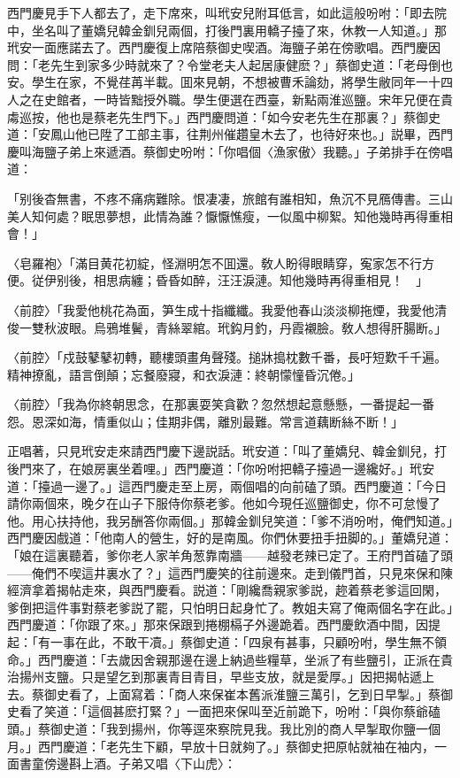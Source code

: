 西門慶見手下人都去了，走下席來，叫玳安兒附耳低言，如此這般吩咐：「即去院中，坐名叫了董嬌兒韓金釧兒兩個，打後門裏用轎子擡了來，休教一人知道。」那玳安一面應諾去了。西門慶復上席陪蔡御史喫酒。海鹽子弟在傍歌唱。西門慶因問：「老先生到家多少時就來了？令堂老夫人起居康健麽？」蔡御史道：「老母倒也安。學生在家，不覺荏苒半載。囬來見朝，不想被曹禾論劾，將學生敝同年一十四人之在史館者，一時皆黜授外職。學生便選在西臺，新點兩淮巡鹽。宋年兄便在貴䖏巡按，他也是蔡老先生門下。」西門慶問道：「如今安老先生在那裏？」蔡御史道：「安鳳山他已陞了工部主事，往荆州催趲皇木去了，也待好來也。」説畢，西門慶叫海鹽子弟上來遞酒。蔡御史吩咐：「你唱個〈漁家傲〉我聽。」子弟排手在傍唱道：

「别後杳無書，不疼不痛病難除。恨凄凄，旅館有誰相知，魚沉不見鴈傳書。三山美人知何處？眠思夢想，此情為誰？懨懨憔瘦，一似風中柳絮。知他幾時再得重相會！」

〈皂羅袍〉「滿目黄花初綻，怪淵明怎不囬還。敎人盼得眼睛穿，寃家怎不行方便。従伊别後，相思病纏；昏昏如醉，汪汪淚漣。知他幾時再得重相見！　」

〈前腔〉「我愛他桃花為面，笋生成十指纖纖。我愛他春山淡淡柳拖煙，我愛他清俊一雙秋波眼。烏鴉堆鬢，青絲翠綰。玳鈎月釣，丹霞襯臉。敎人想得肝腸断。」

〈前腔〉「戍鼓鼕鼕初轉，聽樓頭畫角聲殘。搥牀搗枕數千番，長吁短歎千千遍。精神撩亂，語言倒顛；忘餐廢寢，和衣淚漣：終朝懞憧昏沉倦。」

〈前腔〉「我為你終朝思念，在那裏耍笑貪歡？忽然想起意懸懸，一番提起一番怨。恩深如海，情重似山；佳期非偶，離別最難。常言道藕断絲不断！」

正唱著，只見玳安走來請西門慶下邊説話。玳安道：「叫了董嬌兒、韓金釧兒，打後門來了，在娘房裏坐着哩。」西門慶道：「你吩咐把轎子擡過一邊纔好。」玳安道：「擡過一邊了。」這西門慶走至上房，兩個唱的向前磕了頭。西門慶道：「今日請你兩個來，晚夕在山子下服侍你蔡老爹。他如今現任巡鹽御史，你不可怠慢了他。用心扶持他，我另酬答你兩個。」那韓金釧兒笑道：「爹不消吩咐，俺們知道。」西門慶因戲道：「他南人的營生，好的是南風。你們休要扭手扭脚的。」董嬌兒道：「娘在這裏聽着，爹你老人家羊角葱靠南牆——越發老辣已定了。王府門首磕了頭——俺們不喫這井裏水了？」這西門慶笑的往前邊來。走到儀門首，只見來保和陳經濟拿着揭帖走來，與西門慶看。説道：「剛纔喬親家爹説，趂着蔡老爹這回閑，爹倒把這件事對蔡老爹説了罷，只怕明日起身忙了。教姐夫寫了俺兩個名字在此。」西門慶道：「你跟了來。」那來保跟到捲棚槅子外邊跪着。西門慶飲酒中間，因提起：「有一事在此，不敢干凟。」蔡御史道：「四泉有甚事，只顧吩咐，學生無不領命。」西門慶道：「去歲因舍親那邊在邊上納過些糧草，坐派了有些鹽引，正派在貴治揚州支鹽。只是望乞到那裏青目青目，早些支放，就是愛厚。」因把揭帖遞上去。蔡御史看了，上面寫着：「商人來保崔本舊派淮鹽三萬引，乞到日早掣。」蔡御史看了笑道：「這個甚麽打緊？」一面把來保叫至近前跪下，吩咐：「與你蔡爺磕頭。」蔡御史道：「我到揚州，你等逕來察院見我。我比別的商人早掣取你鹽一個月。」西門慶道：「老先生下顧，早放十日就夠了。」蔡御史把原帖就袖在袖内，一面書童傍邊斟上酒。子弟又唱〈下山虎〉：

